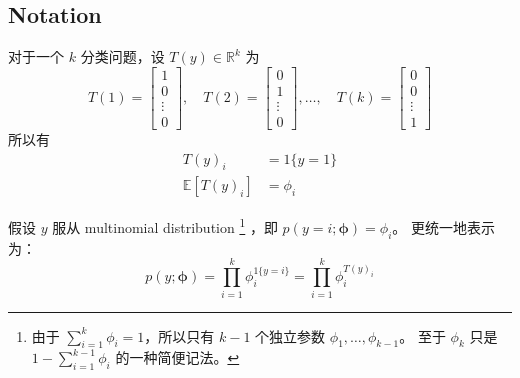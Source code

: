 		\subsection{Notation}
			对于一个 $ k $ 分类问题，设 $ T(y) \in \mathbb{R}^{k} $ 为 
			\begin{equation*}
				T(1) = 
				\begin{bmatrix}
					1\\
					0\\
					\vdots\\
					0
				\end{bmatrix}
				, \quad T(2) = 
				\begin{bmatrix}
				0\\
				1\\
				\vdots\\
				0
				\end{bmatrix}
				, \ldots, \quad T(k) = 
				\begin{bmatrix}
				0\\
				0\\
				\vdots\\
				1
				\end{bmatrix}
			\end{equation*}
			所以有
			\begin{align}
				T(y)_i &= 1\{y=1\} \\
				\mathbb{E}[T(y)_i] &= \phi_i
			\end{align} 
		
			假设 $ y $ 服从 multinomial distribution
			\footnote{由于 $ \sum_{i=1}^{k} \phi_i = 1 $，所以只有 $ k-1 $ 个独立参数 $ \phi_1, \ldots, \phi_{k-1} $。
				至于 $ \phi_k $ 只是 $ 1-\sum_{i=1}^{k-1} \phi_i $ 的一种简便记法。}
			，即
			 $ p(y = i;\bm{\phi}) = \phi_i $。
			更统一地表示为：
			\begin{equation}
			p(y;\bm{\phi}) = \prod_{i=1}^{k} \phi_i ^{ 1\{ y=i \} } = \prod_{i=1}^{k} \phi_i ^{ T(y)_i } \label{eq:glm-probility1}
			\end{equation}
		
